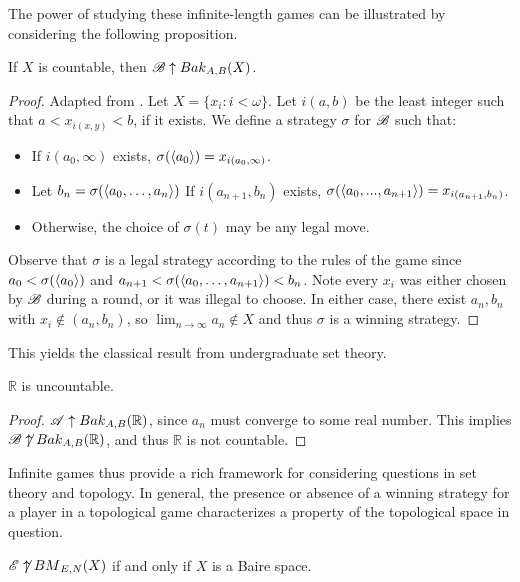 The power of studying these infinite-length games can be illustrated by
considering the following proposition.

\begin{prop}
  If $X$ is countable, then $\mathscr{B} \uparrow {Bak}_{A,B}(X)$.
\end{prop}

\begin{proof}
  Adapted from \cite{noMRbaker}.
  Let $X=\{x_i:i<\omega\}$. Let $i(a,b)$ be the least integer such that
  $a<x_{i(x,y)}<b$, if it exists. We define a strategy $\sigma$ for $\mathscr{B}$
  such that:
  \begin{itemize}
    \item If $i(a_0,\infty)$ exists, $\sigma(\langle a_0\rangle)=x_{i(a_0,\infty)}$.
    \item Let $b_n=\sigma(\langle a_0,\dots,a_n\rangle)$
          If $i(a_{n+1},b_n)$ exists,
          $\sigma(\langle a_0,...,a_{n+1}\rangle)=x_{i(a_{n+1},b_n)}$.
    \item Otherwise, the choice of $\sigma(t)$ may be any legal move.
  \end{itemize}

  Observe that $\sigma$ is a legal strategy according to the rules of the game
  since $a_0<\sigma(\langle a_0\rangle)$ and $a_{n+1}<\sigma(\langle a_0,\dots,a_{n+1}\rangle)<b_n$.
  Note every $x_i$
  was either chosen by $\mathscr{B}$ during a round, or it was illegal to choose.
  In either case, there exist $a_n,b_n$ with $x_i\not\in(a_n,b_n)$, so
  $\lim_{n\to\infty}a_n\not\in X$ and thus $\sigma$ is a winning strategy.
\end{proof}

This yields the classical result from undergraduate set theory.

\begin{cor}
  $\mathbb{R}$ is uncountable.
\end{cor}

\begin{proof}
  $\mathscr{A}\uparrow {Bak}_{A,B}(\mathbb{R})$, since $a_n$ must converge to some
  real number. This implies $\mathscr{B}\not\uparrow {Bak}_{A,B}(\mathbb{R})$, and thus
  $\mathbb{R}$ is not countable.
\end{proof}

Infinite games thus provide a rich framework for considering questions in
set theory and topology. In general, the presence or absence of a winning
strategy for a player in a topological game characterizes a property of the
topological space in question.

\begin{thm}
$\mathscr{E}\not\uparrow {BM}_{E,N}(X)$ if and only if $X$ is a Baire space.
\cite{MR0431104}
\end{thm}

